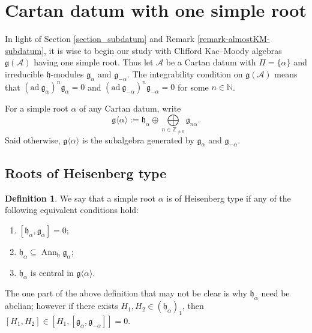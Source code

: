 \documentclass[12pt, a4paper, reqno]{amsart}
\def\Z{\mathbb{Z}}
\def\g{\mathfrak{g}}
\def\h{\mathfrak{h}}
\def\ol{\overline}
\theoremstyle{definition}
\newtheorem{definition}{Definition}
\theoremstyle{definition}
\theoremstyle{definition}
\numberwithin{theorem}{section}
\numberwithin{lemma}{section}
\numberwithin{remark}{section}
\numberwithin{definition}{section}
\numberwithin{corollary}{section}
\numberwithin{proposition}{section}
\numberwithin{example}{section}
\begin{document}
	
	\section{Cartan datum with one simple root}\label{section-one-root}
	
	In light of Section \ref{section_subdatum} and Remark \ref{remark-almostKM-subdatum}, it is wise to begin our study with Clifford Kac--Moody algebras \(\mathfrak{g}(\mathcal{A})\) having one simple root. Thus let \(\mathcal{A}\) be a Cartan datum with \(\Pi = \{\alpha\}\) and irreducible \(\mathfrak{h}\)-modules \(\mathfrak{g}_{\alpha}\) and \(\mathfrak{g}_{-\alpha}\). The integrability condition on \(\mathfrak{g}(\mathcal{A})\) means that \((\mathrm{ad}\ \mathfrak{g}_{\alpha})^n \mathfrak{g}_{\alpha} = 0\) and \((\mathrm{ad}\ \mathfrak{g}_{-\alpha})^n \mathfrak{g}_{-\alpha} = 0\) for some \(n \in \mathbb{N}\).
	
	For a simple root $\alpha$ of any Cartan datum, write 
	\[
	\g\langle\alpha\rangle:=\h_{\alpha}\oplus\bigoplus\limits_{n\in\Z_{\neq0}}\g_{n\alpha}.
	\]
	Said otherwise, $\g\langle\alpha\rangle$ is the subalgebra generated by $\g_{\alpha}$ and $\g_{-\alpha}$.
	
	\subsection{Roots of Heisenberg type}\label{section_heisenberg}
	
	\begin{definition}
		We say that a simple root $\alpha$ is of Heisenberg type if any of the following equivalent conditions hold:
		\begin{enumerate}
			\item $[\h_{\alpha},\mathfrak{g}_{\alpha}]=0$;
			\item $\h_{\alpha}\subseteq\operatorname{Ann}_{\h}\g_{\alpha}$;
			\item $\h_{\alpha}$ is central in $\g\langle\alpha\rangle$.
		\end{enumerate}
	\end{definition}
	The one part of the above definition that may not be clear is why $\h_{\alpha}$ need be abelian; however if there exists $H_1,H_2\in(\h_{\alpha})_{\ol{1}}$, then $[H_1,H_2]\in[H_1,[\g_{\alpha},\g_{-\alpha}]]=0$.  
	
\end{document}
